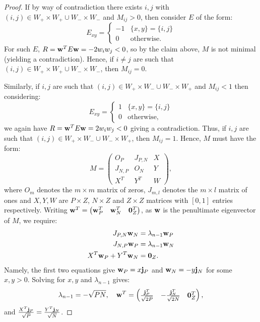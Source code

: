 \documentclass[10pt,a4paper]{amsart}
\begin{document}
\begin{proof}
    If by way of contradiction there exists $i,j$ with $(i,j) \in W_{+}\times W_{+} \cup W_{-}\times W_{-}$ and $M_{ij} > 0$, then consider $E$ of the form:
    \begin{equation*}
        E_{xy} = \begin{cases} -1 & \{x,y\} = \{i,j\} \\ 0 & \text{otherwise.}
        \end{cases}
    \end{equation*}
    For such $E$, $R = \bold{w}^{T}E\bold{w} = -2w_iw_j < 0$, so by the claim above, $M$ is not minimal (yielding a contradiction). Hence, if $i\ne j$ are such that $(i,j) \in W_{+}\times W_{+} \cup W_{-}\times W_{-}$, then $M_{ij} = 0$.  
    
    Similarly, if $i,j$ are such that $(i,j) \in W_{+}\times W_{-} \cup W_{-}\times W_{+}$ and $M_{ij}<1$ then considering:
    \begin{equation*}
        E_{xy} = \begin{cases} 1 & \{x,y\} = \{i,j\} \\ 0 & \text{otherwise,}
        \end{cases}
    \end{equation*}
    we again have $R = \bold{w}^{T}E\bold{w} = 2w_iw_j < 0$ giving a contradiction. Thus, if $i,j$ are such that $(i,j) \in W_{+}\times W_{-} \cup W_{-}\times W_{+}$, then $M_{ij}=1$. Hence, $M$ must have the form:
    \begin{equation*}
        M = \begin{pmatrix} O_{P} & J_{P,N} & X \\ J_{N,P} & O_{N} & Y \\ X^T & Y^T & W
        \end{pmatrix},
    \end{equation*}
    where $O_m$ denotes the $m\times m$ matrix of zeros, $J_{m,l}$ denotes the $m\times l$ matrix of ones and $X,Y,W$ are $P\times Z$, $N\times Z$ and $Z\times Z$ matrices with $[0,1]$ entries respectively. Writing $\bold{w}^T = \begin{pmatrix}\bold{w}^T_P & \bold{w}^T_N & \bold{0}_{Z}^T\end{pmatrix}$, as $\bold{w}$ is the penultimate eigenvector of $M$, we require:
    \begin{align*}
        J_{P,N}\bold{w}_{N} & = \lambda_{n-1} \bold{w}_{P} \\
        J_{N,P}\bold{w}_{P} & = \lambda_{n-1} \bold{w}_{N} \\
        X^T\bold{w}_{P} + Y^T\bold{w}_{N} & = \bold{0}_{Z}.
    \end{align*}
    Namely, the first two equations give $\bold{w}_P = x\bold{j}_P$ and $\bold{w}_N = -y\bold{j}_N$ for some $x,y>0$. Solving for $x,y$ and $\lambda_{n-1}$ gives:
    \begin{equation*}
        \lambda_{n-1} = -\sqrt{PN},\quad \bold{w}^T = \begin{pmatrix}
            \frac{\bold{j}_P^T}{\sqrt{2P}} & -\frac{\bold{j}_N^T}{\sqrt{2N}} & \bold{0}_{Z}^T
        \end{pmatrix},
    \end{equation*}
    and $\frac{X^{T}\bold{j}_{P}}{\sqrt{P}} = \frac{Y^{T}\bold{j}_{N}}{\sqrt{N}}$. 
\end{proof}
\end{document}
